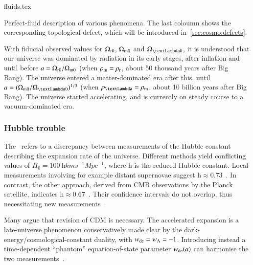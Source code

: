 \begin{table}[h]
    {{fluids.tex}
    \caption{Perfect-fluid description of various phenomena. The last coloumn shows the corresponding topological defect, which will be introduced in~\cref{sec:cosmo:defects}.}
    \label{tab:GR:lcdm:fluids}}
\end{table}

With fiducial observed values for $\Omega_\mathrm{r0}$, $\Omega_\mathrm{m0}$ and $\Omega_{\text{\textLambda}0}$, it is understood that our universe was dominated by radiation in its early stages, after inflation and until before $a=\Omega_\mathrm{r0}/\Omega_\mathrm{m0}$ (when $\rho_\mathrm{m}=\rho_\mathrm{r}$, about 50 thousand years after Big Bang). The universe entered a matter-dominated era after this, until $a=(\Omega\ped{m0}/\Omega_{\text{\textLambda}0})^{1/3}$ (when $\rho_{\text{\textLambda}}=\rho\ped{m}$, about 10 billion years after Big Bang). The universe started accelerating, and is currently on steady course to a vacuum-dominated era. 


\subsubsection{Hubble trouble}
    The~ refers to a discrepancy between measurements of the Hubble constant describing the expansion rate of the universe. Different methods yield conflicting values of $H_0 = 100~ \mathrm{h} \unit{km} \unit{s^{-1}} \unit{Mpc^{-1}}$, where $\mathrm{h}$ is the reduced Hubble constant. Local measurements involving for example distant supernovae suggest $\mathrm{h} \approx 0.73$~\citep[e.g.][]{maggioreGravitationalWavesVol2018}. In contrast, the other approach, derived from CMB observations by the Planck satellite, indicates $\mathrm{h}\approx 0.67$~\citep[e.g.][]{maggioreGravitationalWavesVol2018}. Their confidence intervals do not overlap, thus necessitating new measurements~\citep[e.g.][]{maggioreGravitationalWavesVol2018}. %


    Many argue that revision of \textLambda{}CDM is necessary. The accelerated expansion is a late-universe phenomenon conservatively made clear by the dark-energy/cosmological-constant duality, with $w_\mathrm{de}=w_{\Lambda}=-1$. %
    Introducing instead a time-dependent ``phantom'' equation-of-state parameter $w_\mathrm{de}(a)$ can harmonise the two measurements~\citep{maggioreGravitationalWavesVol2018}. %







